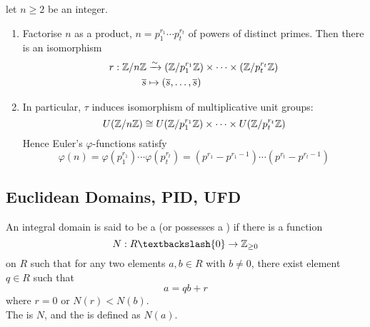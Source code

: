\begin{corollary}
let $n \geq 2$ be an integer.
\begin{enumerate}[label=(\roman*)]
\item Factorise $n$ as a product, $n = p_1^{r_1} \cdots p_t^{r_t}$ of powers of distinct primes. Then there is an isomorphism
\begin{align}
r: \mathbb{Z} /n\mathbb{Z}  &\xrightarrow{\sim} (\mathbb{Z}/p_1^{r_1}\mathbb{Z}) \times \cdots \times (\mathbb{Z}/p_t^{r_t}\mathbb{Z}) \nonumber\\
\overline{s} &\mapsto (\overline{s}, \ldots, \overline{s}) \nonumber
\end{align}
\item In particular, $\tau$ induces isomorphism of multiplicative unit groups:
\begin{equation}
	U(\mathbb{Z}/n\mathbb{Z}) \cong U(\mathbb{Z}/p_1^{r_1}\mathbb{Z}) \times \cdots \times U(\mathbb{Z}/p_t^{r_t}\mathbb{Z}) \nonumber
\end{equation}
Hence Euler's $\varphi$-functions satisfy
\begin{equation}
	\varphi(n) = \varphi(p_1^{r_1}) \cdots \varphi(p_t^{r_t}) = (p^{r_1} - p^{r_1 -1}) \cdots (p^{r_t} - p^{r_t -1}) \nonumber
\end{equation}
\end{enumerate}
\end{corollary}

\subsection{Euclidean Domains, PID, UFD}

\begin{definition}
An integral domain is said to be a  (or possesses a ) if there is a function
\begin{equation}
	N:R \textbackslash \{0\} \rightarrow \Z_{\geq 0} \nonumber
\end{equation}
on $R$ such that for any two elements $a, b \in R$ with $b \neq 0$, there exist element $q \in R$ such that
\begin{equation}
	a=qb+r \nonumber
\end{equation}
where $r=0$ or $N(r)<N(b)$.\\
The  is $N$, and the  is defined as $N(a)$.
\end{definition}

